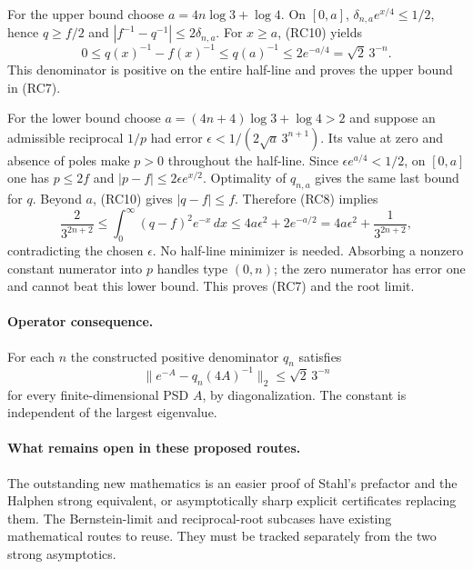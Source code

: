 \documentclass[11pt,a4paper]{article}
\theoremstyle{definition}
\begin{document}
For the upper bound choose $a=4n\log3+\log4$. On $[0,a]$,
$\delta_{n,a}e^{x/4}\le1/2$, hence $q\ge f/2$ and
$|f^{-1}-q^{-1}|\le2\delta_{n,a}$.
For $x\ge a$, (RC10) yields
\[
 0\le q(x)^{-1}-f(x)^{-1}\le q(a)^{-1}
 \le2e^{-a/4}=\sqrt2\,3^{-n}.
\]
This denominator is positive on the entire half-line and proves the
upper bound in (RC7).

For the lower bound choose $a=(4n+4)\log3+\log4>2$ and suppose
an admissible reciprocal $1/p$ had error
$\epsilon<1/(2\sqrt a\,3^{n+1})$.
Its value at zero and absence of poles make $p>0$ throughout the
half-line. Since $\epsilon e^{a/4}<1/2$, on $[0,a]$ one has
$p\le2f$ and $|p-f|\le2\epsilon e^{x/2}$.
Optimality of $q_{n,a}$ gives the same last bound for $q$.
Beyond $a$, (RC10) gives $|q-f|\le f$. Therefore (RC8) implies
\[
 \frac2{3^{2n+2}}
 \le\int_0^\infty(q-f)^2e^{-x}\,dx
 \le4a\epsilon^2+2e^{-a/2}
 =4a\epsilon^2+\frac1{3^{2n+2}},
\]
contradicting the chosen $\epsilon$. No half-line minimizer is needed.
Absorbing a nonzero constant numerator into $p$ handles type $(0,n)$;
the zero numerator has error one and cannot beat this lower bound.
This proves (RC7) and the root limit.

\paragraph{Operator consequence.}
For each $n$ the constructed positive denominator $q_n$ satisfies
\[
 \|e^{-A}-q_n(4A)^{-1}\|_2\le\sqrt2\,3^{-n}
\]
for every finite-dimensional PSD $A$, by diagonalization.
The constant is independent of the largest eigenvalue.

\paragraph{What remains open in these proposed routes.}
The outstanding new mathematics is an easier proof of Stahl's
prefactor and the Halphen strong equivalent, or asymptotically sharp
explicit certificates replacing them. The Bernstein-limit and
reciprocal-root subcases have existing mathematical routes to reuse.
They must be tracked separately from the two strong asymptotics.


\appendix
\end{document}
